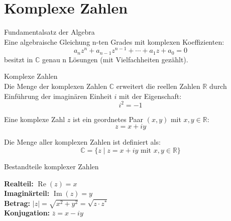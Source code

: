 

\section{Komplexe Zahlen}

\begin{lemma}{Fundamentalsatz der Algebra}\\
Eine algebraische Gleichung n-ten Grades mit komplexen Koeffizienten:
$$a_nz^n + a_{n-1}z^{n-1} + \cdots + a_1z + a_0 = 0$$
besitzt in $\mathbb{C}$ genau n Lösungen (mit Vielfachheiten gezählt).
\end{lemma}

\begin{concept}{Komplexe Zahlen}\\
Die Menge der komplexen Zahlen $\mathbb{C}$ erweitert die reellen Zahlen $\mathbb{R}$ durch Einführung der imaginären Einheit $i$ mit der Eigenschaft:
$$i^2 = -1$$

Eine komplexe Zahl $z$ ist ein geordnetes Paar $(x,y)$ mit $x,y \in \mathbb{R}$:
$$z = x + iy$$

Die Menge aller komplexen Zahlen ist definiert als:
$$\mathbb{C} = \{z \mid z = x + iy \text{ mit } x,y \in \mathbb{R}\}$$
\end{concept}

\begin{definition}{Bestandteile komplexer Zahlen}\\
\begin{minipage}[t]{0.6\textwidth}
    \vspace{-7mm}
    \textbf{Realteil:} $\operatorname{Re}(z) = x$\\
    \textbf{Imaginärteil:} $\operatorname{Im}(z) = y$\\
    \textbf{Betrag:} $|z| = \sqrt{x^2 + y^2} = \sqrt{z \cdot z^*}$\\
    \textbf{Konjugation:} $\overline{z} = x - iy$
\end{minipage}
\begin{minipage}{0.35\textwidth}
    \vspace{-3mm}
\end{minipage}
\end{definition}


